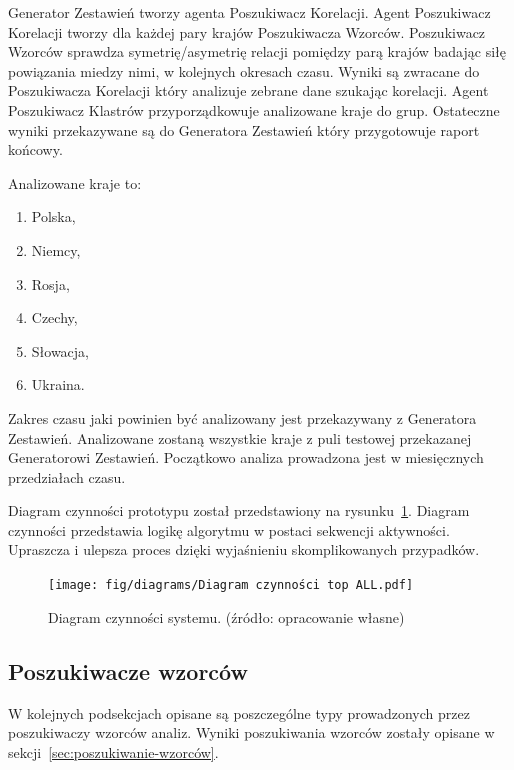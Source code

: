 \documentclass[11pt]{report}
\begin{document}
    Generator Zestawień tworzy agenta Poszukiwacz Korelacji.
    Agent Poszukiwacz Korelacji tworzy dla każdej pary krajów Poszukiwacza Wzorców.
    Poszukiwacz Wzorców sprawdza symetrię/asymetrię relacji pomiędzy parą krajów badając siłę powiązania miedzy nimi, w kolejnych okresach czasu.
    Wyniki są zwracane do Poszukiwacza Korelacji który analizuje zebrane dane szukając korelacji.
    Agent Poszukiwacz Klastrów przyporządkowuje analizowane kraje do grup.
    Ostateczne wyniki przekazywane są do Generatora Zestawień który przygotowuje raport końcowy.

    Analizowane kraje to:
    \begin{enumerate}
        \item Polska,
        \item Niemcy,
        \item Rosja,
        \item Czechy,
        \item Słowacja,
        \item Ukraina.
    \end{enumerate}

    Zakres czasu jaki powinien być analizowany jest przekazywany z Generatora Zestawień.
    Analizowane zostaną wszystkie kraje z puli testowej przekazanej Generatorowi Zestawień.
    Początkowo analiza prowadzona jest w miesięcznych przedziałach czasu.

    Diagram czynności prototypu został przedstawiony na rysunku~\ref{fig:diagram_czynności_top}.
    Diagram czynności przedstawia logikę algorytmu w postaci sekwencji aktywności.
    Upraszcza i ulepsza proces dzięki wyjaśnieniu skomplikowanych przypadków.

    \begin{figure}[!ht]
        \centering
        \texttt{[image: fig/diagrams/Diagram czynności top ALL.pdf]}
        \caption{Diagram czynności systemu. (źródło: opracowanie własne)}
        \label{fig:diagram_czynności_top}
    \end{figure}

    \subsection{Poszukiwacze wzorców}
    W kolejnych podsekcjach opisane są poszczególne typy prowadzonych przez poszukiwaczy wzorców analiz.
    Wyniki poszukiwania wzorców zostały opisane w sekcji~\ref{sec:poszukiwanie-wzorców}.
\end{document}
